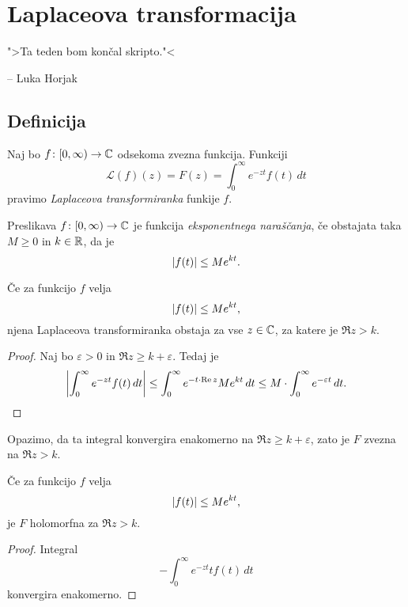 \section{Laplaceova transformacija}

\epigraph{">Ta teden bom končal skripto."<}{-- Luka Horjak}

\subsection{Definicija}

\begin{definicija}
Naj bo $f \colon [0, \infty) \to \mathbb{C}$ odsekoma zvezna funkcija.
Funkciji
\[
\mathscr{L}(f)(z) = F(z) = \int_0^\infty e^{-zt} f(t)\,dt
\]
pravimo
\emph{Laplaceova transformiranka}
funkije $f$.
\end{definicija}

\begin{definicija}
Preslikava $f \colon [0, \infty) \to \mathbb{C}$ je funkcija
\emph{eksponentnega naraščanja}, če obstajata taka $M \geq 0$ in
$k \in \mathbb{R}$, da je
\[
\left\lvert f(t)\right\rvert \leq M e^{kt}.
\]
\end{definicija}

\begin{trditev}
Če za funkcijo $f$ velja
\[
\left\lvert f(t)\right\rvert \leq M e^{kt},
\]
njena Laplaceova transformiranka obstaja za vse $z \in \mathbb{C}$, za
katere je $\Re z > k$.
\end{trditev}

\begin{proof}
Naj bo $\varepsilon > 0$ in $\Re z \geq k + \varepsilon$. Tedaj je
\[
\left\lvert \int_0^\infty e^{-zt} f(t)\,dt\right\rvert \leq
\int_0^\infty e^{-t \cdot \operatorname{Re} z} M e^{kt}\,dt \leq
M \cdot \int_0^\infty e^{-\varepsilon t}\,dt. \qedhere
\]
\end{proof}

\begin{opomba}
Opazimo, da ta integral konvergira enakomerno na
$\Re z \geq k + \varepsilon$, zato je $F$ zvezna na $\Re z > k$.
\end{opomba}

\begin{trditev}
Če za funkcijo $f$ velja
\[
\left\lvert f(t)\right\rvert \leq M e^{kt},
\]
je $F$ holomorfna za $\Re z > k$.
\end{trditev}

\begin{proof}
Integral
\[
-\int_0^\infty e^{-zt} t f(t)\,dt
\]
konvergira enakomerno.
\end{proof}

